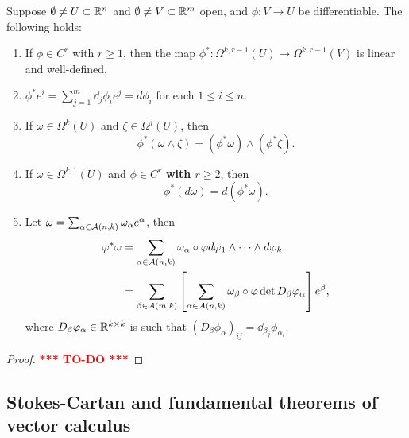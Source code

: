 \documentclass[a4paper]{article}
\newcommand{\TODO}{\textcolor{red}{\textbf{*** TO-DO ***}}}
\begin{document}
\begin{thm}
  Suppose $\emptyset \neq U \subset \mathbb{R}^n$ and $\emptyset \neq V \subset
    \mathbb{R}^m$ open, and $\phi : V \to U$ be differentiable. The following holds:
  \begin{enumerate}
    \item If $\phi \in C^r$ with $r \geq 1$, then the map $\phi^* :
          \Omega^{k, r-1}(U) \to \Omega^{k, r-1}(V)$ is linear and
          well-defined.

    \item $\phi^* e^i = \sum_{j=1}^m \dd_j \phi_i e^j = d \phi_i$
          for each $1 \leq i \leq n$.

    \item If $\omega \in \Omega^k(U)$ and $\zeta \in \Omega^j(U)$, then
          \[
            \phi^* (\omega \wedge \zeta) = (\phi^* \omega) \wedge
            (\phi^* \zeta).
          \]

    \item If $\omega \in \Omega^{k, 1} (U)$ and $\phi \in C^r$
          \textbf{with $r \geq 2$}, then
          \[
            \phi^* (d \omega) = d (\phi^* \omega).
          \]

    \item Let $\omega = \sum_{\alpha \in \mathcal{A}(n, k)} \omega_\alpha
          e^\alpha$, then
          \[
            \begin{aligned}
              \varphi^* \omega
               & = \sum_{\alpha \in \mathcal{A}(n, k)} \omega_\alpha \circ \varphi
              d \varphi_1 \wedge \dots \wedge d \varphi_k                       \\
               & = \sum_{\beta \in \mathcal{A}(m, k)}
              \left[ \sum_{\alpha \in \mathcal{A}(n, k)} \omega_\beta \circ \varphi
                \det D_\beta \varphi_\alpha \right] e^\beta,
            \end{aligned}
          \]
          where $D_\beta \varphi_\alpha \in \mathbb{R}^{k \times k}$ is such that
          $(D_\beta \phi_\alpha)_{ij} = \dd_{\beta_j} \phi_{\alpha_i}$.
  \end{enumerate}
\end{thm}

\begin{proof}
  \TODO
\end{proof}

\subsection{Stokes-Cartan and fundamental theorems
  of vector calculus}
\end{document}
